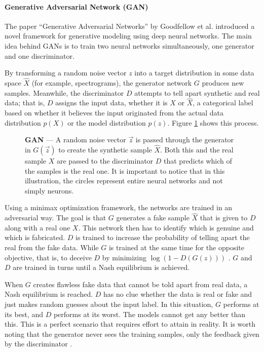 \paragraph{Generative Adversarial Network (GAN)} \label{sec:gan}

The paper ``Generative Adversarial Networks'' by Goodfellow et al. \cite{goodfellow_generative_2014} introduced a novel framework for generative modeling using deep neural networks. The main idea behind \acp{GAN} is to train two neural networks simultaneously, one generator and one discriminator.

By transforming a random noise vector $z$ into a target distribution in some data space $\hat{X}$ (for example, spectrograms), the generator network $G$ produces new samples. Meanwhile, the discriminator $D$ attempts to tell apart synthetic and real data; that is, $D$ assigns the input data, whether it is $X$ or $\hat{X}$, a categorical label based on whether it believes the input originated from the actual data distribution $p(X)$ or the model distribution $p(z)$. Figure \ref{fig:gan} shows this process.


\begin{figure}[ht]
    \centering
    \caption[Generative adversarial network]{\textbf{\Acf{GAN}} --- A random noise vector $\vec{z}$ is passed through the generator in $G(\vec{z})$ to create the synthetic sample $\hat{X}$. Both this and the real sample $X$ are passed to the discriminator $D$ that predicts which of the samples is the real one. It is important to notice that in this illustration, the circles represent entire neural networks and not simply neurons.}
    \label{fig:gan}
\end{figure}

Using a minimax optimization framework, the networks are trained in an adversarial way. The goal is that $G$ generates a fake sample $\hat{X}$ that is given to $D$ along with a real one $X$. This network then has to identify which is genuine and which is fabricated. $D$ is trained to increase the probability of telling apart the real from the fake data. While $G$ is trained at the same time for the opposite objective, that is, to deceive $D$ by minimizing $\log(1 - D(G(z)))$ \cite{huzaifah_deep_2021}. $G$ and $D$ are trained in turns until a Nash equilibrium is achieved.

When $G$ creates flawless fake data that cannot be told apart from real data, a Nash equilibrium is reached. $D$ has no clue whether the data is real or fake and just makes random guesses about the input label. In this situation, $G$ performs at its best, and $D$ performs at its worst. The models cannot get any better than this. This is a perfect scenario that requires effort to attain in reality. It is worth noting that the generator never sees the training samples, only the feedback given by the discriminator \cite{huzaifah_deep_2021}.

